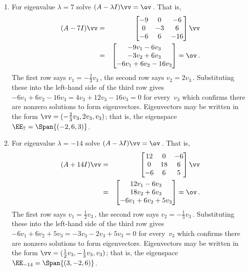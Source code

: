\begin{example}
\begin{solution}
\begin{enumerate}
\begin{enumerate}
\item For eigenvalue \(\lambda=7\) solve \((A-\lambda I)\vv=\ov\)\,.  
That is,
\begin{eqnarray*}
(A-7I)\vv&=&\begin{bmatrix} -9&0&-6\\0&-3&6\\-6&6&-16 \end{bmatrix}\vv
\\&=&\begin{bmatrix} -9v_1-6v_3\\-3v_2+6v_3\\-6v_1+6v_2-16v_3 \end{bmatrix}=\ov\,.
\end{eqnarray*}
The first row says \(v_1=-\frac23v_3\)\,, 
the second row says \(v_2=2v_3\)\,.  
Substituting these into the left-hand side of the third row gives
\(-6v_1+6v_2-16v_3=4v_3+12v_3-16v_3=0\) for every~\(v_3\) which confirms there are nonzero solutions to form eigenvectors.
Eigenvectors may be written in the form 
\(\vv=(-\frac23v_3,2v_3,v_3)\); that is, the eigenspace \(\EE_7=\Span\{(-2,6,3)\}\).

\item For eigenvalue \(\lambda=-14\) solve \((A-\lambda I)\vv=\ov\)\,.  
That is,
\begin{eqnarray*}
(A+14I)\vv&=&\begin{bmatrix} 12&0&-6\\0&18&6\\-6&6&5 \end{bmatrix}\vv
\\&=&\begin{bmatrix} 12v_1-6v_3\\18v_2+6v_3\\-6v_1+6v_2+5v_3 \end{bmatrix}=\ov\,.
\end{eqnarray*}
The first row says \(v_1=\frac12v_3\)\,, 
the second row says \(v_2=-\frac13v_3\)\,.  
Substituting these into the left-hand side of the third row gives
\(-6v_1+6v_2+5v_3=-3v_3-2v_3+5v_3=0\) for every~\(v_3\) which confirms there are nonzero solutions to form eigenvectors.
Eigenvectors may be written in the form 
\(\vv=(\frac12v_3,-\frac13v_3,v_3)\); 
that is, the eigenspace \(\EE_{-14}=\Span\{(3,-2,6)\}\).

\end{enumerate}
\end{enumerate}
\end{solution}
\end{example}



